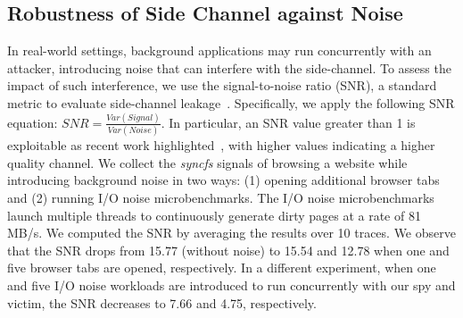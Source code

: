  \subsection{Robustness of Side Channel against Noise}
In real-world settings, background applications may run concurrently with an attacker, introducing noise that can interfere with the side-channel. To assess the impact of such interference, we use the signal-to-noise ratio (SNR), a standard metric to evaluate side-channel leakage{~\cite{mangard2004hardware}}. Specifically, we apply the following SNR equation: $SNR = \frac{Var(Signal)}{Var(Noise)}$.
In particular, an SNR value greater than 1 is exploitable as recent work highlighted{~\cite{zhang2023s}}, with higher values indicating a higher quality channel.  We collect the \textit{syncfs} signals of browsing a website while introducing background noise in two ways: (1) opening additional browser tabs and (2) running I/O noise microbenchmarks. The I/O noise microbenchmarks launch multiple threads to continuously generate dirty pages at a rate of 81 MB/s.  We computed the SNR by averaging the results over 10 traces. We observe that the SNR drops from 15.77 (without noise) to 15.54 and 12.78 when one and five browser tabs are opened, respectively. In a different experiment, when one and five I/O noise workloads are introduced to run concurrently with our spy and victim, the SNR decreases to 7.66 and 4.75, respectively. 

